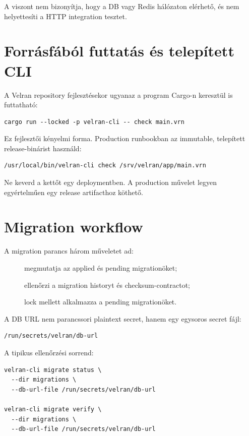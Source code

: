A  viszont nem bizonyítja, hogy a DB vagy Redis hálózaton elérhető, és nem helyettesíti a HTTP integration tesztet.

\section{Forrásfából futtatás és telepített CLI}

A Velran repository fejlesztésekor ugyanaz a program Cargo-n keresztül is futtatható:

\begin{lstlisting}
cargo run --locked -p velran-cli -- check main.vrn
\end{lstlisting}

Ez fejlesztői kényelmi forma. Production runbookban az immutable, telepített release-binárist használd:

\begin{lstlisting}
/usr/local/bin/velran-cli check /srv/velran/app/main.vrn
\end{lstlisting}

Ne keverd a kettőt egy deploymentben. A production művelet legyen egyértelműen egy release artifacthoz köthető.

\section{Migration workflow}

A migration parancs három műveletet ad:

\begin{description}
  \item[] megmutatja az applied és pending migrationöket;
  \item[] ellenőrzi a migration historyt és checksum-contractot;
  \item[] lock mellett alkalmazza a pending migrationöket.
\end{description}

A DB URL nem parancssori plaintext secret, hanem egy egysoros secret fájl:

\begin{lstlisting}
/run/secrets/velran/db-url
\end{lstlisting}

A tipikus ellenőrzési sorrend:

\begin{lstlisting}
velran-cli migrate status \
  --dir migrations \
  --db-url-file /run/secrets/velran/db-url

velran-cli migrate verify \
  --dir migrations \
  --db-url-file /run/secrets/velran/db-url
\end{lstlisting}

